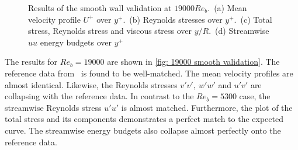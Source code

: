 \begin{figure}[h]
    \centering
    \begin{subfigure}{0.495\textwidth}
        \subcaption{}
        
        \label{subfig: 19000 validation velocity profile}
    \end{subfigure}
    \hfill
    \begin{subfigure}{0.495\textwidth}
        \subcaption{}
        
        \label{subfig: 19000 validation Reynolds stress}
    \end{subfigure}
    \plotverticalspacing
    \begin{subfigure}{0.495\textwidth}
        \subcaption{}
        
        \label{subfig: 19000 validation total stress}
    \end{subfigure}
    \hfill
        \begin{subfigure}{0.495\textwidth}
        \subcaption{}
        
        \label{subfig: 19000 validation budgets}
    \end{subfigure}
    \plotverticalspacing
    \caption[Results of the smooth wall validation at $Re_b = 19000$]{Results of the smooth wall validation at $19000 Re_b$.~(a) Mean velocity profile $U^+$ over $y^+$.~(b) Reynolds stresses over $y^+$.~(c) Total stress, Reynolds stress and viscous stress over $y/R$.~(d) Streamwise $uu$ energy budgets over $y^+$}
    \label{fig: 19000 smooth validation}
\end{figure}
The results for $Re_b = 19000$ are shown in \autoref{fig: 19000 smooth validation}.
The reference data from~\cite{yaoDirectNumericalSimulations2023} is found to be well-matched. 
The mean velocity profiles are almost identical.
Likewise, the Reynolds stresses $v'v',\ w'w'$ and $u'v'$ are collapsing with the reference data.
In contrast to the $Re_b = 5300$ case, the streamwise Reynolds stress $u'u'$ is almost matched.
Furthermore, the plot of the total stress and its components demonstrates a perfect match to the expected curve.
The streamwise energy budgets also collapse almost perfectly onto the reference data.
\newpage
